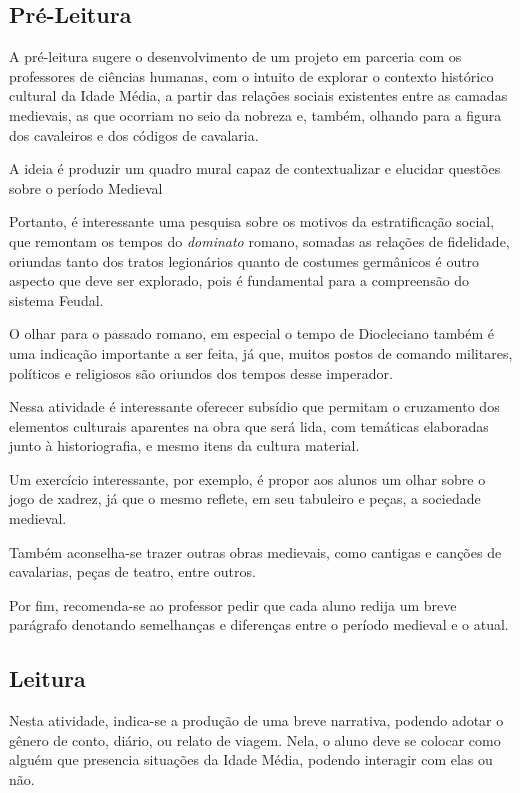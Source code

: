 \documentclass[12pt]{extarticle}
\begin{document}
\subsection{Pré-Leitura}


A pré-leitura sugere o desenvolvimento de um projeto em
parceria com os professores de ciências humanas, com o intuito de
explorar o contexto histórico cultural da Idade Média, a partir das
relações sociais existentes entre as camadas medievais, as que ocorriam
no seio da nobreza e, também, olhando para a figura dos cavaleiros e dos
códigos de cavalaria.

A ideia é produzir um quadro mural capaz de contextualizar e elucidar
questões sobre o período Medieval

Portanto, é interessante uma pesquisa sobre os motivos da estratificação
social, que remontam os tempos do \emph{dominato} romano, somadas as
relações de fidelidade, oriundas tanto dos tratos legionários quanto de
costumes germânicos é outro aspecto que deve ser explorado, pois é
fundamental para a compreensão do sistema Feudal.

O olhar para o passado romano, em especial o tempo de Diocleciano também
é uma indicação importante a ser feita, já que, muitos postos de comando
militares, políticos e religiosos são oriundos dos tempos desse
imperador.

Nessa atividade é interessante oferecer subsídio que permitam o
cruzamento dos elementos culturais aparentes na obra que será lida, com
temáticas elaboradas junto à historiografia, e mesmo itens da cultura
material.

Um exercício interessante, por exemplo, é propor aos alunos um olhar
sobre o jogo de xadrez, já que o mesmo reflete, em seu tabuleiro e
peças, a sociedade medieval.

Também aconselha-se trazer outras obras medievais, como cantigas e
canções de cavalarias, peças de teatro, entre outros.

Por fim, recomenda-se ao professor pedir que cada aluno redija um breve
parágrafo denotando semelhanças e diferenças entre o período medieval e
o atual.

\subsection{Leitura}

Nesta atividade, indica-se a produção de uma breve
narrativa, podendo adotar o gênero de conto, diário, ou relato de
viagem. Nela, o aluno deve se colocar como alguém que presencia
situações da Idade Média, podendo interagir com elas ou não.
\end{document}
